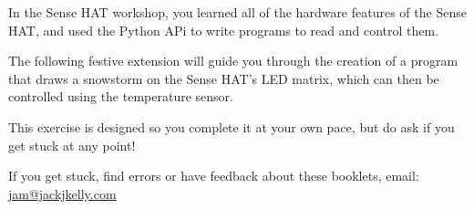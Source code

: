 \setcounter{section}{-1}

	In the Sense HAT workshop, you learned all of the hardware features of the Sense HAT, and used the Python APi to write programs to read and control them.
	
	The following festive extension will guide you through the creation of a program that draws a snowstorm on the Sense HAT's LED matrix, which can then be controlled using the temperature sensor.
	
	This exercise is designed so you complete it at your own pace, but do ask if you get stuck at any point!

	\iffalse
	These booklets were created using {\fontfamily{rfdefault}\selectfont \LaTeX}, an advanced typesetting system used for several sorts of books, academic reports and letters. Source files are available at \url{http://github.com/McrRaspJam/booklet-workshops}
		
	To allow modification and redistribution of these booklets, they are distributed under the \hbox{CC BY-SA 4.0} License. 	
	\fi

	If you get stuck, find errors or have feedback about these booklets, email:
	\url{jam@jackjkelly.com}\label{email}